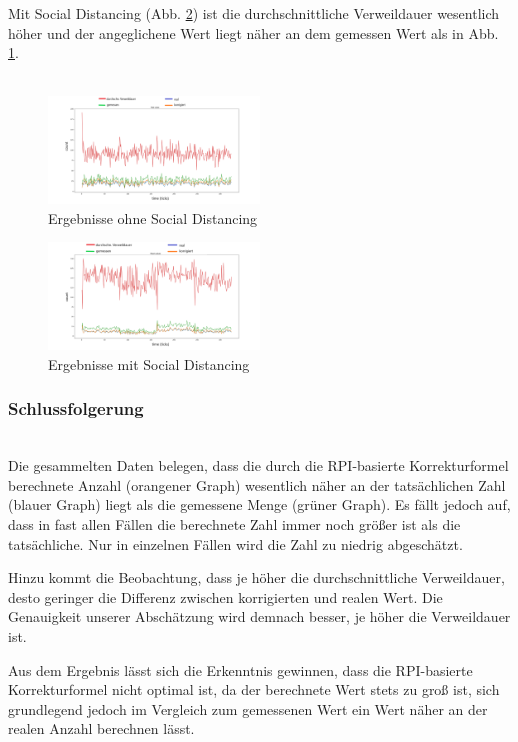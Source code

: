 \documentclass[conference,compsoc]{IEEEtran}
\begin{document}
Mit Social Distancing (Abb. \ref{mast_data_plotted_social_distancing_old}) ist die durchschnittliche Verweildauer wesentlich höher und der angeglichene Wert liegt näher an dem gemessen Wert als in Abb. \ref{mast_data_plotted_old}. \\ \\
\begin{figure}[h]
	\centering
	\includegraphics[width=0.5\textwidth]{"Mast_Data_Plotted_old"}
	\caption{Ergebnisse ohne Social Distancing}
	\label{mast_data_plotted_old}
\end{figure}
\begin{figure}[h]
	\centering
	\includegraphics[width=0.5\textwidth]{"Mast_Data_Plotted_Social_Distancing_old"}
	\caption{Ergebnisse mit Social Distancing}
	\label{mast_data_plotted_social_distancing_old}
\end{figure}
\subsubsection{Schlussfolgerung}
\text{}\\
Die gesammelten Daten belegen, dass die durch die RPI-basierte Korrekturformel berechnete Anzahl (orangener Graph) wesentlich näher an der tatsächlichen Zahl (blauer Graph) liegt als die gemessene Menge (grüner Graph).
Es fällt jedoch auf, dass in fast allen Fällen die berechnete Zahl immer noch größer ist als die tatsächliche. Nur in einzelnen Fällen wird die Zahl zu niedrig abgeschätzt.

Hinzu kommt die Beobachtung, dass je höher die durchschnittliche Verweildauer, desto geringer die Differenz zwischen korrigierten und realen Wert. 
Die Genauigkeit unserer Abschätzung wird demnach besser, je höher die Verweildauer ist.

Aus dem Ergebnis lässt sich die Erkenntnis gewinnen, dass die RPI-basierte Korrekturformel nicht optimal ist, da der berechnete Wert stets zu groß ist, 
sich grundlegend jedoch im Vergleich zum gemessenen Wert ein Wert näher an der realen Anzahl berechnen lässt.\\
\end{document}
